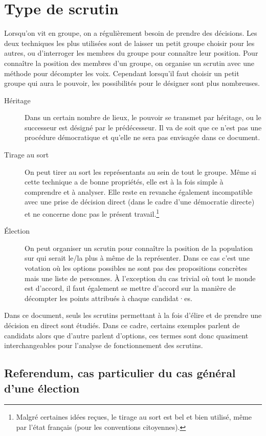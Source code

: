 \documentclass[../report]{subfiles}
\begin{document}
  \section{Type de scrutin}
  Lorsqu'on vit en groupe, on a régulièrement besoin de prendre des décisions.
  Les deux techniques les plus utilisées sont de laisser un petit groupe choisir pour les autres, ou 
  d'interroger les membres du groupe pour connaître leur position.
  Pour connaître la position des membres d'un groupe, on organise un scrutin avec une méthode pour décompter
  les voix.
  Cependant lorsqu'il faut choisir un petit groupe qui aura le pouvoir, les possibilités pour le désigner sont
  plus nombreuses.
  \begin{description}
  	\item[Héritage] Dans un certain nombre de lieux, le pouvoir se transmet par héritage, ou le successeur est désigné par le prédécesseur.
  	Il va de soit que ce n'est pas une procédure démocratique et qu'elle ne sera pas envisagée dans ce document.
  	\item[Tirage au sort] On peut tirer au sort les représentants au sein de tout le groupe. 
  	Même si cette technique a de bonne propriétés, elle est à la fois simple à comprendre et à analyser. Elle reste en revanche également
  	incompatible avec une prise de décision direct (dans le cadre d'une démocratie directe) et ne concerne donc pas le présent travail.\footnote{Malgré certaines idées reçues, le tirage au sort est bel et bien utilisé, même par l'état français (pour les conventions citoyennes).}
  	\item[Élection] On peut organiser un scrutin pour connaître la position de la population sur qui serait le/la plus 
  	à même de la représenter. 
  	Dans ce cas c'est une votation où les options possibles ne sont pas des propositions concrètes mais une liste de personnes.
  	À l'exception du cas trivial où tout le monde est d'accord, il faut également se mettre d'accord sur la manière
  	de décompter les points attribués à chaque candidat·es.
  \end{description}
  
  Dans ce document, seuls les scrutins permettant à la fois d'élire et de prendre une décision en direct sont étudiés.
  Dans ce cadre, certains exemples parlent de candidats alors que d'autre parlent d'options, ces termes sont donc quasiment 
  interchangeables pour l'analyse de fonctionnement des scrutins.
  
  \subsection[Referendum, cas particulier]{Referendum, cas particulier du cas général d'une élection}
  
\end{document}
